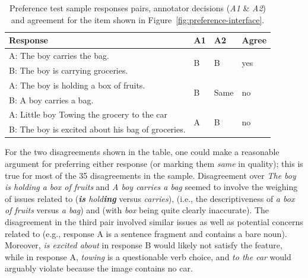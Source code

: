 \begin{table}[htb!]
\begin{center}
\begin{tabular}{|l|l|l|l|}
\hline
 Response & A1 & A2 & Agree \\
\hline
\hline
A: The boy carries the bag. & \multirow{2}{*}{B} & \multirow{2}{*}{B} & \multirow{2}{*}{yes} \\
\cline{1-1}
B: The boy is carrying groceries. & & & \\
\hline
\hline
A: The boy is holding a box of fruits. & \multirow{2}{*}{B} & \multirow{2}{*}{Same} & \multirow{2}{*}{no} \\
\cline{1-1}
B: A boy carries a bag. & & & \\
\hline
\hline
A: Little boy Towing the grocery to the car & \multirow{2}{*}{A} & \multirow{2}{*}{B} & \multirow{2}{*}{no} \\
\cline{1-1}
B: The boy is excited about his bag of groceries. & & & \\
\hline
\end{tabular}
\caption{\label{tab:preference-example-pairs} Preference test sample responses pairs, annotator decisions (\textit{A1} \& \textit{A2}) and agreement for the item shown in Figure~\ref{fig:preference-interface}.}
\end{center}
\end{table}

For the two disagreements shown in the table, one could make a reasonable argument for preferring either response (or marking them \textit{same} in quality); this is true for  most of the 35 disagreements in the sample. Disagreement over \textit{The boy is holding a box of fruits} and \textit{A boy carries a bag} seemed to involve the weighing of issues related to  (\textit{\textbf{is} hold\textbf{ing}} versus \textit{carries}),  (i.e., the descriptiveness of \textit{a box of fruits} versus \textit{a bag}) and  (with \textit{box} being quite clearly inaccurate). The disagreement in the third pair involved similar  issues as well as potential concerns related to  (e.g., response A is a sentence fragment and contains a bare noun). Moreover, \textit{is excited about} in response B would likely not satisfy the  feature, while in response A, \textit{towing} is a questionable verb choice, and \textit{to the car} would arguably violate  because the image contains no car.

